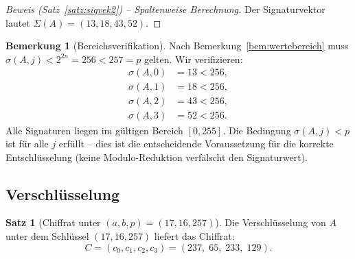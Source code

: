 ﻿\documentclass[a4paper,12pt]{scrreprt}
\theoremstyle{definition}
\newtheorem{bemerkung}{Bemerkung}[section]
\newtheorem{satz}{Satz}[section]
\begin{document}
\begin{proof}[Beweis (Satz~\ref{satz:sigvek2}) -- Spaltenweise Berechnung]
Der Signaturvektor lautet $\Sigma(A) = (13, 18, 43, 52)$.
\end{proof}

\begin{bemerkung}[Bereichsverifikation]
Nach Bemerkung~\ref{bem:wertebereich} muss $\sigma(A,j) < 2^{2n} = 256 < 257 = p$ gelten. Wir verifizieren:
\begin{align*}
\sigma(A,0) &= 13 < 256, \\
\sigma(A,1) &= 18 < 256, \\
\sigma(A,2) &= 43 < 256, \\
\sigma(A,3) &= 52 < 256.
\end{align*}
Alle Signaturen liegen im gültigen Bereich $[0, 255]$. Die Bedingung $\sigma(A,j) < p$ ist für alle $j$ erfüllt -- dies ist die entscheidende Voraussetzung für die korrekte Entschlüsselung (keine Modulo-Reduktion verfälscht den Signaturwert).
\end{bemerkung}

\subsection{Verschlüsselung}

\begin{satz}[Chiffrat unter $(a, b, p) = (17, 16, 257)$]
\label{satz:chiffrat1716}
Die Verschlüsselung von $A$ unter dem Schlüssel $(17, 16, 257)$ liefert das Chiffrat:
\[
C = (c_0, c_1, c_2, c_3) = (237,\; 65,\; 233,\; 129).
\]
\end{satz}
\end{document}
